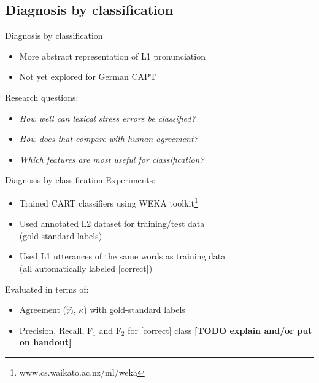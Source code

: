 \documentclass[xcolor={dvipsnames}]{beamer}
\newcommand{\TODO}[1]{{\color{red}\textbf{[TODO #1]}}}
\begin{document}
		
		
	\subsection{Diagnosis by classification}
		\begin{frame}{Diagnosis by classification}
		\begin{itemize}
		\item More abstract representation of L1 pronunciation
		\item Not yet explored for German CAPT
		\end{itemize}
		\vfill
		Research questions:
		\begin{itemize}
		\item \textit{How well can lexical stress errors be classified?}
		\item \textit{How does that compare with human agreement?}
		\item \textit{Which features are most useful for classification?}
		\end{itemize}	
		\end{frame}	
		
		\begin{frame}{Diagnosis by classification}
		Experiments:
		\begin{itemize}
		\item Trained CART classifiers using WEKA toolkit\footnote{www.cs.waikato.ac.nz/ml/weka}
		\item Used annotated L2 dataset for training/test data\\(gold-standard labels)
		\item Used L1 utterances of the same words as training data \\(all automatically labeled [correct])
		\end{itemize}
		
		\vfill
		
		Evaluated in terms of:
		\begin{itemize}
		\item Agreement (\%, $\kappa$) with gold-standard labels
		\item Precision, Recall, F$_1$ and F$_2$ for [correct] class \TODO{explain and/or put on handout}
		\end{itemize}
		\end{frame}
\end{document}
